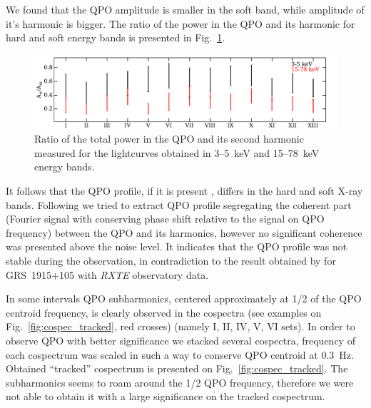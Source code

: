 \documentclass[a4paper,fleqn,usenatbib]{mnras}
\begin{document}
We found that the QPO amplitude is smaller in the soft band, while amplitude of it's harmonic is bigger.
The ratio of the power in the QPO and its harmonic for hard and soft energy bands is presented in Fig.~\ref{fig:qpo_ratio}.
\begin{figure}
\includegraphics[width=\columnwidth]{QPO_and_harmonic_ratio_ylabel.pdf}
        \caption{Ratio of the total power in the QPO and its second harmonic measured for the lightcurves obtained in 3--5~keV and 15--78~keV energy bands.}
        \label{fig:qpo_ratio}
\end{figure}
It follows that the QPO profile, if it is present \citep[see, e.g.][]{2015MNRAS.446.3516I}, differs in the hard and soft X-ray bands.
Following \citep{2015MNRAS.446.3516I} we tried to extract QPO profile segregating the coherent part (Fourier signal with conserving phase shift relative to the signal on QPO frequency) between the QPO and its harmonics, however no significant coherence was presented above the noise level.
It indicates that the QPO profile was not stable during the observation, in contradiction to the result obtained by \citet{2015MNRAS.446.3516I} for GRS~1915+105 with {\it RXTE} observatory data.


In some intervals QPO subharmonics, centered approximately at 1/2 of the QPO centroid frequency, is clearly observed in the cospectra (see examples on Fig.~\ref{fig:cospec_tracked}, red crosses) (namely I, II, IV, V, VI sets).
In order to observe QPO with better significance we stacked several cospectra, frequency of each cospectrum was scaled in such a way to conserve QPO centroid at 0.3~Hz.
Obtained ``tracked'' cospectrum is presented on Fig.~\ref{fig:cospec_tracked}.
The subharmonics seems to roam around the 1/2 QPO frequency, therefore we were not able to obtain it with a large significance on the tracked cospectrum.
\end{document}
